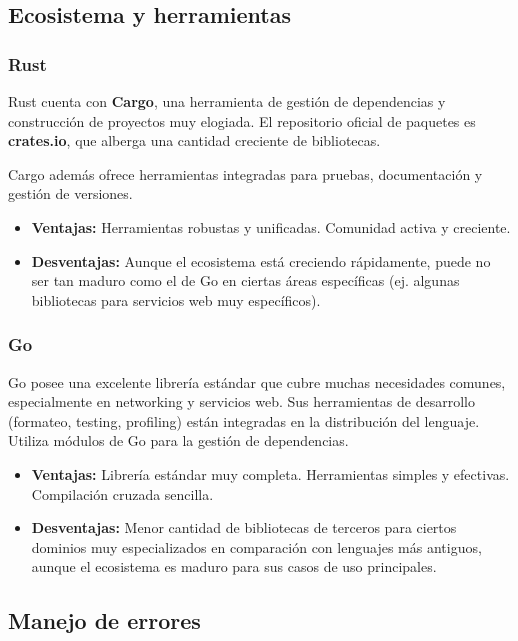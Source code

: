 \subsection{Ecosistema y herramientas}
\subsubsection{Rust}

Rust cuenta con \textbf{Cargo}, una herramienta de gestión de dependencias y construcción de proyectos muy elogiada. El repositorio oficial de paquetes es \textbf{crates.io}, que alberga una cantidad creciente de bibliotecas.

Cargo además ofrece herramientas integradas para pruebas, documentación y gestión de versiones.
\begin{itemize}
    \item \textbf{Ventajas:} Herramientas robustas y unificadas. Comunidad activa y creciente.
    \item \textbf{Desventajas:} Aunque el ecosistema está creciendo rápidamente, puede no ser tan maduro como el de Go en ciertas áreas específicas (ej. algunas bibliotecas para servicios web muy específicos).
\end{itemize}

\subsubsection{Go}

Go posee una excelente librería estándar que cubre muchas necesidades comunes, especialmente en networking y servicios web. Sus herramientas de desarrollo (formateo, testing, profiling) están integradas en la distribución del lenguaje. Utiliza módulos de Go para la gestión de dependencias.
\begin{itemize}
    \item \textbf{Ventajas:} Librería estándar muy completa. Herramientas simples y efectivas. Compilación cruzada sencilla.
    \item \textbf{Desventajas:} Menor cantidad de bibliotecas de terceros para ciertos dominios muy especializados en comparación con lenguajes más antiguos, aunque el ecosistema es maduro para sus casos de uso principales.
\end{itemize}

\subsection{Manejo de errores}
